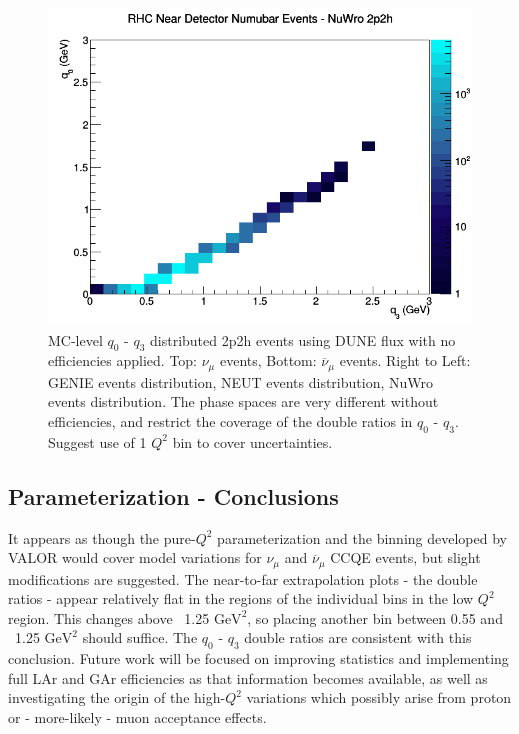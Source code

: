 \documentclass[12pt]{article}
\begin{document}
\begin{figure}[h]
\endminipage
{}
\includegraphics[width=\linewidth]{q0_q3/nominal/2p2h_RHC_ND_numubar_q3_q0_NuWro.png}
\endminipage
\caption{MC-level $q_0 \textrm{ - } q_3$ distributed 2p2h events using DUNE flux with no efficiencies applied. Top: $\nu_{\mu}$ events, Bottom: $\overline{\nu}_{\mu}$ events. Right to Left: GENIE events distribution, NEUT events distribution, NuWro events distribution. The phase spaces are very different without efficiencies, and restrict the coverage of the double ratios in $q_0 \textrm{ - } q_3$. Suggest use of 1 $Q^2$ bin to cover uncertainties.}
\label{fig:q0q3_2p2h_events}
\end{figure}
\FloatBarrier

\subsection{Parameterization - Conclusions}
It appears as though the pure-$Q^2$ parameterization and the binning developed by VALOR would cover model variations for $\nu_{\mu}$ and $\overline{\nu}_{\mu}$ CCQE events, but slight modifications are suggested. The near-to-far extrapolation plots - the double ratios - appear relatively flat in the regions of the individual bins in the low $Q^2$ region. This changes above ~1.25 $\textrm{GeV}^2$, so placing another bin between 0.55 and ~1.25 $\textrm{GeV}^2$ should suffice. The $q_0 \textrm{ - } q_3$ double ratios are consistent with this conclusion. Future work will be focused on improving statistics and implementing full LAr and GAr efficiencies as that information becomes available, as well as investigating the origin of the high-$Q^2$ variations which possibly arise from proton or - more-likely - muon acceptance effects. 
\end{document}
